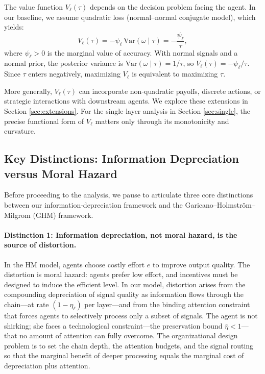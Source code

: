 The value function $V_\ell(\tau)$ depends on the decision problem facing the agent. In our baseline, we assume quadratic loss (normal--normal conjugate model), which yields:
\begin{equation}\label{eq:value_function}
V_\ell(\tau) = -\psi_\ell \, \text{Var}(\omega \mid \tau) = -\frac{\psi_\ell}{\tau},
\end{equation}
where $\psi_\ell > 0$ is the marginal value of accuracy. With normal signals and a normal prior, the posterior variance is $\text{Var}(\omega \mid \tau) = 1/\tau$, so $V_\ell(\tau) = -\psi_\ell/\tau$. Since $\tau$ enters negatively, maximizing $V_\ell$ is equivalent to maximizing $\tau$.

More generally, $V_\ell(\tau)$ can incorporate non-quadratic payoffs, discrete actions, or strategic interactions with downstream agents. We explore these extensions in Section \ref{sec:extensions}. For the single-layer analysis in Section \ref{sec:single}, the precise functional form of $V_\ell$ matters only through its monotonicity and curvature.

\subsection{Key Distinctions: Information Depreciation versus Moral Hazard}
\label{subsec:distinctions}

Before proceeding to the analysis, we pause to articulate three core distinctions between our information-depreciation framework and the Garicano--Holmstr\"{o}m--Milgrom (GHM) framework.

\paragraph{Distinction 1: Information depreciation, not moral hazard, is the source of distortion.} In the HM model, agents choose costly effort $e$ to improve output quality. The distortion is moral hazard: agents prefer low effort, and incentives must be designed to induce the efficient level. In our model, distortion arises from the compounding depreciation of signal quality as information flows through the chain---at rate $(1-\eta_\ell)$ per layer---and from the binding attention constraint that forces agents to selectively process only a subset of signals. The agent is not shirking; she faces a technological constraint---the preservation bound $\bar{\eta} < 1$---that no amount of attention can fully overcome. The organizational design problem is to set the chain depth, the attention budgets, and the signal routing so that the marginal benefit of deeper processing equals the marginal cost of depreciation plus attention.

